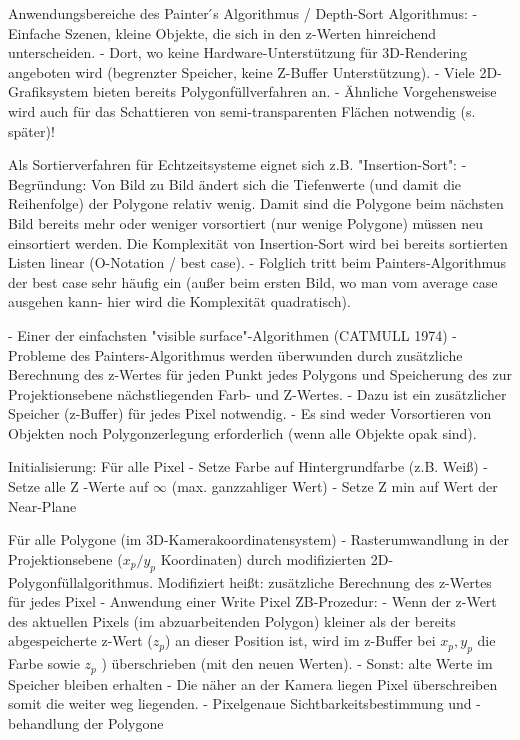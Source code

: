 \documentclass[10pt,landscape]{article}
\begin{document}
\begin{multicols}{3}
  Anwendungsbereiche des Painter ́s Algorithmus / Depth-Sort Algorithmus:
  - Einfache Szenen, kleine Objekte, die sich in den z-Werten hinreichend unterscheiden.
  - Dort, wo keine Hardware-Unterstützung für 3D-Rendering angeboten wird (begrenzter Speicher, keine Z-Buffer Unterstützung).
  - Viele 2D-Grafiksystem bieten bereits Polygonfüllverfahren an.
  - Ähnliche Vorgehensweise wird auch für das Schattieren von semi-transparenten Flächen notwendig (s. später)!
  
  Als Sortierverfahren für Echtzeitsysteme eignet sich z.B. "Insertion-Sort":
  - Begründung: Von Bild zu Bild ändert sich die Tiefenwerte (und damit die Reihenfolge) der Polygone relativ wenig. Damit sind die Polygone beim nächsten Bild bereits mehr oder weniger vorsortiert (nur wenige Polygone) müssen neu einsortiert werden. Die Komplexität von Insertion-Sort wird bei bereits sortierten Listen linear (O-Notation / best case).
  - Folglich tritt beim Painters-Algorithmus der best case sehr häufig ein (außer beim ersten Bild, wo man vom average case ausgehen kann- hier wird die Komplexität quadratisch).
  
  - Einer der einfachsten "visible surface"-Algorithmen (CATMULL 1974)
  - Probleme des Painters-Algorithmus werden überwunden durch zusätzliche Berechnung des z-Wertes für jeden Punkt jedes Polygons und Speicherung des zur Projektionsebene nächstliegenden Farb- und Z-Wertes.
  - Dazu ist ein zusätzlicher Speicher (z-Buffer) für jedes Pixel notwendig.
  - Es sind weder Vorsortieren von Objekten noch Polygonzerlegung erforderlich (wenn alle Objekte opak sind).
  
  Initialisierung: Für alle Pixel
  - Setze Farbe auf Hintergrundfarbe (z.B. Weiß)
  - Setze alle Z -Werte auf $\infty$ (max. ganzzahliger Wert)
  - Setze Z min auf Wert der Near-Plane
  
  Für alle Polygone (im 3D-Kamerakoordinatensystem)
  - Rasterumwandlung in der Projektionsebene ($x_p/y_p$ Koordinaten) durch modifizierten 2D-Polygonfüllalgorithmus. Modifiziert heißt: zusätzliche Berechnung des z-Wertes für jedes Pixel
  - Anwendung einer Write Pixel ZB-Prozedur:
  - Wenn der z-Wert des aktuellen Pixels (im abzuarbeitenden Polygon) kleiner als der bereits abgespeicherte z-Wert ($z_p$) an dieser Position ist, wird im z-Buffer bei $x_p , y_p$ die Farbe sowie $z_p$ ) überschrieben (mit den neuen Werten).
  - Sonst: alte Werte im Speicher bleiben erhalten
  - Die näher an der Kamera liegen Pixel überschreiben somit die weiter weg liegenden.
  - Pixelgenaue Sichtbarkeitsbestimmung und -behandlung der Polygone
  

\end{multicols}
\end{document}
